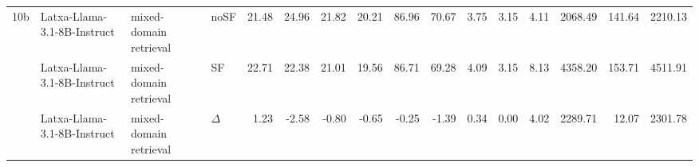 \begin{landscape}
\begin{footnotesize}
\begin{longtable}{l l l l r r r r r r r r r r r r}
10b & Latxa-Llama-3.1-8B-Instruct & mixed-domain retrieval & noSF & 21.48 & 24.96 & 21.82 & 20.21 & 86.96 & 70.67 & 3.75 & 3.15 & 4.11 & 2068.49 & 141.64 & 2210.13 \\
 & Latxa-Llama-3.1-8B-Instruct & mixed-domain retrieval & SF & 22.71 & 22.38 & 21.01 & 19.56 & 86.71 & 69.28 & 4.09 & 3.15 & 8.13 & 4358.20 & 153.71 & 4511.91 \\
 & Latxa-Llama-3.1-8B-Instruct & mixed-domain retrieval & $\Delta$ & 1.23 & -2.58 & -0.80 & -0.65 & -0.25 & -1.39 & 0.34 & 0.00 & 4.02 & 2289.71 & 12.07 & 2301.78 \\
\end{longtable}
\end{footnotesize}
\end{landscape}
